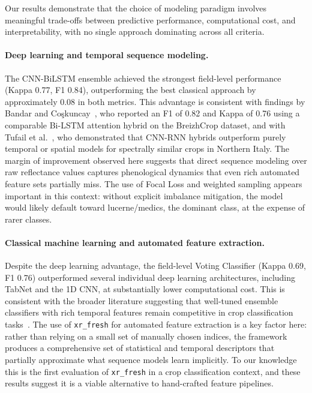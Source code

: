 \documentclass[pdflatex,sn-mathphys]{sn-jnl} %
\begin{document}
Our results demonstrate that the choice of modeling paradigm involves meaningful
trade-offs between predictive performance, computational cost, and interpretability, with no single approach dominating across all criteria.

\paragraph{Deep learning and temporal sequence modeling.}

The CNN-BiLSTM ensemble achieved the strongest field-level performance (Kappa
0.77, F1 0.84), outperforming the best classical approach by approximately 0.08
in both metrics. This advantage is consistent with findings by Bandar and
Co\c{s}kuncay~\cite{bandar2024bilstm}, who reported an F1 of 0.82 and Kappa of 0.76
using a comparable Bi-LSTM attention hybrid on the BreizhCrop dataset, and with
Tufail et al.~\cite{tufail2025cnnrnn}, who demonstrated that CNN-RNN hybrids
outperform purely temporal or spatial models for spectrally similar crops in
Northern Italy. The margin of improvement observed here suggests that direct
sequence modeling over raw reflectance values captures phenological dynamics
that even rich automated feature sets partially miss. The use of Focal Loss and
weighted sampling appears important in this context: without explicit
imbalance mitigation, the model would likely default toward lucerne/medics, the
dominant class, at the expense of rarer classes.

\paragraph{Classical machine learning and automated feature extraction.}

Despite the deep learning advantage, the field-level Voting Classifier (Kappa
0.69, F1 0.76) outperformed several individual deep learning architectures,
including TabNet and the 1D CNN, at substantially lower computational cost. This
is consistent with the broader literature suggesting that well-tuned ensemble
classifiers with rich temporal features remain competitive in crop classification
tasks~\cite{mann2025, mahlayeye2024}. The use of \texttt{xr\_fresh} for
automated feature extraction is a key factor here: rather than relying on a
small set of manually chosen indices, the framework produces a comprehensive
set of statistical and temporal descriptors that partially approximate what
sequence models learn implicitly. To our knowledge this is the first evaluation
of \texttt{xr\_fresh} in a crop classification context, and these results
suggest it is a viable alternative to hand-crafted feature pipelines.
\end{document}
